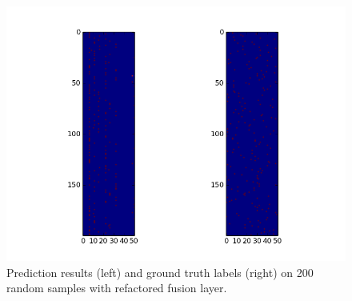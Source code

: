 \begin{figure}
	\centering
	\includegraphics[width=\textwidth]{img/prediction_refactored.png}
	\caption{Prediction results (left) and ground truth labels (right) on 200 random samples with refactored fusion layer.}
	\label{fig:prediction_refactored}
\end{figure}